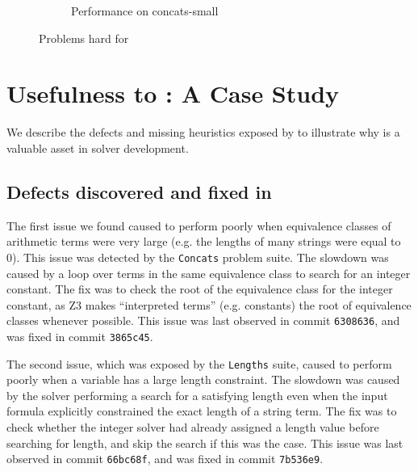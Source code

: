 \begin{figure}[h]
\begin{subfigure}{.5\textwidth}
            \label{fig:concats-small}
            \vspace{-0.25in}
            \caption{Performance on concats-small}
        \end{subfigure}
        \vspace{-0.1in}
        \caption{Problems hard for \us{}}
        \label{fig:z3str3-hard}
        \vspace{-0.3in}
    \end{figure}

    
\section{Usefulness to \us{}: A Case Study}
\label{sec:analysis}

        We describe the defects and missing heuristics exposed by \fuzzer{} to illustrate why \fuzzer{} is a valuable asset in solver development.


\subsection{Defects discovered and fixed in \us{}}


The first issue we found caused \us{} to perform poorly when equivalence classes 
of arithmetic terms were very large (e.g. the lengths of many strings were equal
to 0). This issue was detected by the \texttt{Concats} problem suite. The slowdown 
was caused by a loop over terms in the same equivalence class to search for an 
integer constant. The fix was to check the root of the equivalence class for the 
integer constant, as Z3 makes ``interpreted terms'' (e.g. constants) the root of 
equivalence classes whenever possible. This issue was last observed in commit 
\texttt{6308636}, and was fixed in commit \texttt{3865c45}.


The second issue, which was exposed by the \texttt{Lengths} suite, caused \us{} to 
perform poorly when a variable has a large length constraint.
The slowdown was caused by the solver performing a search for a satisfying length
even when the input formula explicitly constrained the exact length of a string term.
The fix was to check whether the integer solver had already assigned a length value
before searching for length, and skip the search if this was the case.
This issue was last observed in commit \texttt{66bc68f}, and was fixed in commit 
\texttt{7b536e9}.    
    
